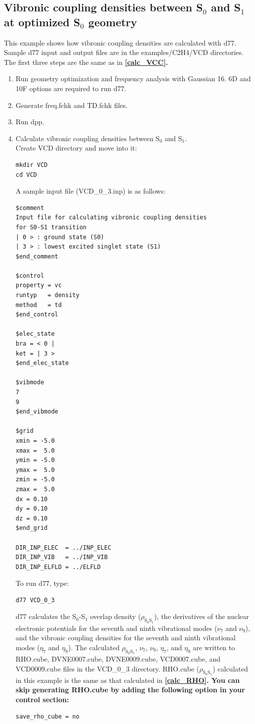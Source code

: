 ﻿\documentclass[11pt,a4paper,openany]{article}
\begin{document}
\subsection{Vibronic coupling densities between S$_0$ and S$_1$ at optimized S$_0$ geometry}
This example shows how vibronic coupling densities are calculated with d77. 
Sample d77 input and output files are in the examples/C2H4/VCD directories. The first three steps are the same as in \bf{\ref{calc_VCC}}\rm{.}
\begin{enumerate}

\item{Run geometry optimization and frequency analysis with Gaussian 16. 6D and 10F options are required to run d77.}
\item{Generate freq.fchk and TD.fchk files.}
\item{Run dpp.}

\item{
Calculate vibronic coupling densities between S$_0$ and S$_1$.\\
Create VCD directory and move into it:
\begin{verbatim}
mkdir VCD
cd VCD
\end{verbatim} 
A sample input file (VCD\_0\_3.inp) is as follows:
\begin{verbatim}
$comment
Input file for calculating vibronic coupling densities
for S0-S1 transition
| 0 > : ground state (S0)
| 3 > : lowest excited singlet state (S1)
$end_comment

$control
property = vc
runtyp   = density
method   = td
$end_control

$elec_state
bra = < 0 |
ket = | 3 >
$end_elec_state

$vibmode
7
9
$end_vibmode

$grid
xmin = -5.0
xmax =  5.0
ymin = -5.0
ymax =  5.0
zmin = -5.0
zmax =  5.0
dx = 0.10
dy = 0.10
dz = 0.10
$end_grid

DIR_INP_ELEC  = ../INP_ELEC
DIR_INP_VIB   = ../INP_VIB
DIR_INP_ELFLD = ../ELFLD
\end{verbatim}
To run d77, type:
\begin{verbatim} 
d77 VCD_0_3 
\end{verbatim}
d77 calculates the S$_0$-S$_1$ overlap density ($\rho_{\mathrm{S}_0\mathrm{S}_1}$), 
the derivatives of the nuclear electronic potentials for the seventh and ninth vibrational modes ($\nu_7$ and $\nu_9$),
and the vibronic coupling densities for the seventh and ninth vibrational modes ($\eta_7$ and $\eta_9$).
The calculated $\rho_{\mathrm{S}_0\mathrm{S}_1}$, $\nu_7$, $\nu_9$, $\eta_7$, and $\eta_9$
are written to RHO.cube, DVNE0007.cube, DVNE0009.cube, VCD0007.cube, and VCD0009.cube files 
in the VCD\_0\_3 directory.
RHO.cube ($\rho_{\mathrm{S}_0\mathrm{S}_1}$) calculated in this example
is the same as that calculated in \bf{\ref{calc_RHO}}\rm{.}
You can skip generating RHO.cube by adding the following option in your control section:
\begin{verbatim} 
save_rho_cube = no
\end{verbatim}
}
\end{enumerate}
\end{document}
